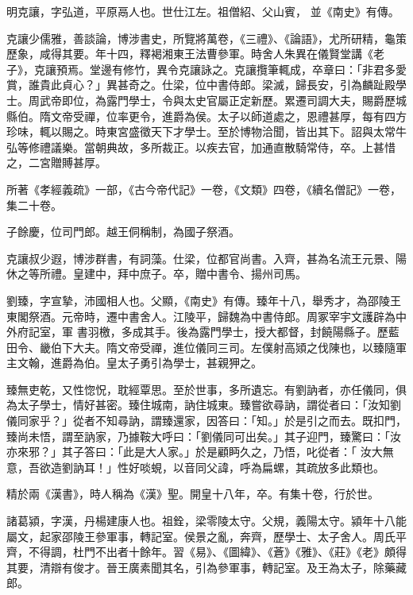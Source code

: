 \begin{pinyinscope}
 明克讓，字弘道，平原鬲人也。世仕江左。祖僧紹、父山賓，
 並《南史》有傳。



 克讓少儒雅，善談論，博涉書史，所覽將萬卷，《三禮》、《論語》，尤所研精，龜策歷象，咸得其要。年十四，釋褐湘東王法曹參軍。時舍人朱異在儀賢堂講《老子》，克讓預焉。堂邊有修竹，異令克讓詠之。克讓攬筆輒成，卒章曰：「非君多愛賞，誰貴此貞心？」異甚奇之。仕梁，位中書侍郎。梁滅，歸長安，引為麟趾殿學士。周武帝即位，為露門學士，令與太史官屬正定新歷。累遷司調大夫，賜爵歷城縣伯。隋文帝受禪，位率更令，進爵為侯。太子以師道處之，恩禮甚厚，每有四方珍味，輒以賜之。時東宮盛徵天下才學士。至於博物洽聞，皆出其下。詔與太常牛
 弘等修禮議樂。當朝典故，多所裁正。以疾去官，加通直散騎常侍，卒。上甚惜之，二宮贈賻甚厚。



 所著《孝經義疏》一部，《古今帝代記》一卷，《文類》四卷，《續名僧記》一卷，集二十卷。



 子餘慶，位司門郎。越王侗稱制，為國子祭酒。



 克讓叔少遐，博涉群書，有詞藻。仕梁，位都官尚書。入齊，甚為名流王元景、陽休之等所禮。皇建中，拜中庶子。卒，贈中書令、揚州司馬。



 劉臻，字宣摯，沛國相人也。父顯，《南史》有傳。臻年十八，舉秀才，為邵陵王東閣祭酒。元帝時，遷中書舍人。江陵平，歸魏為中書侍郎。周冢宰宇文護辟為中外府記室，軍
 書羽檄，多成其手。後為露門學士，授大都督，封饒陽縣子。歷藍田令、畿伯下大夫。隋文帝受禪，進位儀同三司。左僕射高熲之伐陳也，以臻隨軍主文翰，進爵為伯。皇太子勇引為學士，甚親狎之。



 臻無吏乾，又性惚怳，耽經覃思。至於世事，多所遺忘。有劉訥者，亦任儀同，俱為太子學士，情好甚密。臻住城南，訥住城東。臻嘗欲尋訥，謂從者曰：「汝知劉儀同家乎？」從者不知尋訥，謂臻還家，因答曰：「知。」於是引之而去。既扣門，臻尚未悟，謂至訥家，乃據鞍大呼曰：「劉儀同可出矣。」其子迎門，臻驚曰：「汝亦來邪？」其子答曰：「此是大人家。」於是顧眄久之，乃悟，叱從者：「
 汝大無意，吾欲造劉訥耳！」性好啖蜆，以音同父諱，呼為扁螺，其疏放多此類也。



 精於兩《漢書》，時人稱為《漢》聖。開皇十八年，卒。有集十卷，行於世。



 諸葛潁，字漢，丹楊建康人也。祖銓，梁零陵太守。父規，義陽太守。潁年十八能屬文，起家邵陵王參軍事，轉記室。侯景之亂，奔齊，歷學士、太子舍人。周氏平齊，不得調，杜門不出者十餘年。習《易》、《圖緯》、《蒼》《雅》、《莊》《老》頗得其要，清辯有俊才。晉王廣素聞其名，引為參軍事，轉記室。及王為太子，除藥藏郎。




\end{pinyinscope}
